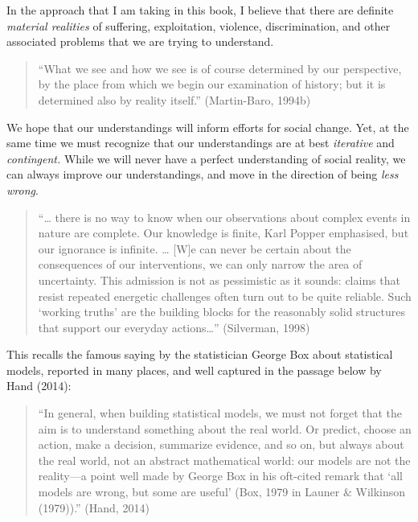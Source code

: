 \documentclass[
  letterpaper,
  DIV=11,
  numbers=noendperiod]{scrreprt}
\begin{document}
In the approach that I am taking in this book, I believe that there are
definite \emph{material realities} of suffering, exploitation, violence,
discrimination, and other associated problems that we are trying to
understand.

\begin{quote}
``What we see and how we see is of course determined by our perspective,
by the place from which we begin our examination of history; but it is
determined also by reality itself.'' (Martin-Baro, 1994b)
\end{quote}

We hope that our understandings will inform efforts for social change.
Yet, at the same time we must recognize that our understandings are at
best \emph{iterative} and \emph{contingent.} While we will never have a
perfect understanding of social reality, we can always improve our
understandings, and move in the direction of being \emph{less wrong}.

\begin{quote}
``\ldots{} there is no way to know when our observations about complex
events in nature are complete. Our knowledge is finite, Karl Popper
emphasised, but our ignorance is infinite. \ldots{} {[}W{]}e can never
be certain about the consequences of our interventions, we can only
narrow the area of uncertainty. This admission is not as pessimistic as
it sounds: claims that resist repeated energetic challenges often turn
out to be quite reliable. Such `working truths' are the building blocks
for the reasonably solid structures that support our everyday
actions\ldots{}'' (Silverman, 1998) 
\end{quote}

This recalls the famous saying by the statistician George Box about
statistical models, reported in many places, and well captured in the
passage below by Hand (2014):

\begin{quote}
``In general, when building statistical models, we must not forget that
the aim is to understand something about the real world. Or predict,
choose an action, make a decision, summarize evidence, and so on, but
always about the real world, not an abstract mathematical world: our
models are not the reality---a point well made by George Box in his
oft-cited remark that `all models are wrong, but some are useful' (Box,
1979 in Launer \& Wilkinson (1979)).'' (Hand, 2014) 
\end{quote}
\end{document}
